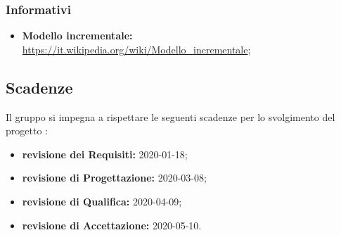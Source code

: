 \subsubsection{Informativi}
\begin{itemize}
\item \textbf{Modello incrementale:}\\ \url{https://it.wikipedia.org/wiki/Modello_incrementale};
\end{itemize}

\subsection{Scadenze}
Il gruppo \Omicron{} si impegna a rispettare le seguenti scadenze per lo svolgimento del progetto \nameproject{}:
\begin{itemize}
\item \textbf{revisione dei Requisiti:} 2020-01-18;
\item \textbf{revisione di Progettazione:} 2020-03-08;
\item \textbf{revisione di Qualifica:} 2020-04-09;
\item \textbf{revisione di Accettazione:} 2020-05-10.
\end{itemize}